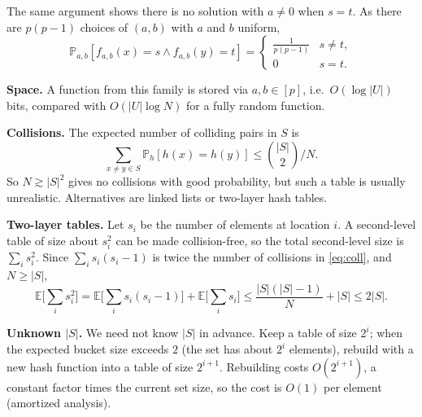  
 
The same argument shows there is no solution with $a\neq0$ when $s=t$. As there are $p(p-1)$ choices of $(a,b)$ with $a$ and $b$ uniform,
\begin{equation}\label{eq:pair}
  \mathbb{P}_{a,b}[f_{a,b}(x)=s\wedge f_{a,b}(y)=t]=
  \begin{cases}\frac{1}{p(p-1)} & s\neq t,\\ 0 & s=t.\end{cases}
\end{equation}
 
 
 
\textbf{Space.} A function from this family is stored via $a,b\in[p]$, i.e.\ $O(\log|U|)$ bits, compared with $O(|U|\log N)$ for a fully random function.
 
\textbf{Collisions.} The expected number of colliding pairs in $S$ is
\begin{equation}\label{eq:coll}
  \sum_{x\neq y\in S}\mathbb{P}_{h}[h(x)=h(y)]\le\binom{|S|}{2}\Big/N.
\end{equation}
So $N\gtrsim|S|^2$ gives no collisions with good probability, but such a table is usually unrealistic. Alternatives are linked lists or two-layer hash tables.
 
\textbf{Two-layer tables.} Let $s_i$ be the number of elements at location $i$. A second-level table of size about $s_i^2$ can be made collision-free, so the total second-level size is $\sum_i s_i^2$. Since $\sum_i s_i(s_i-1)$ is twice the number of collisions in \eqref{eq:coll}, and $N\ge|S|$,
\[
  \mathbb{E}\Big[\sum_i s_i^2\Big]=\mathbb{E}\Big[\sum_i s_i(s_i-1)\Big]+\mathbb{E}\Big[\sum_i s_i\Big]\le\frac{|S|(|S|-1)}{N}+|S|\le2|S|.
\]
 
\textbf{Unknown $|S|$.} We need not know $|S|$ in advance. Keep a table of size $2^i$; when the expected bucket size exceeds $2$ (the set has about $2^i$ elements), rebuild with a new hash function into a table of size $2^{i+1}$. Rebuilding costs $O(2^{i+1})$, a constant factor times the current set size, so the cost is $O(1)$ per element (amortized analysis).
 

